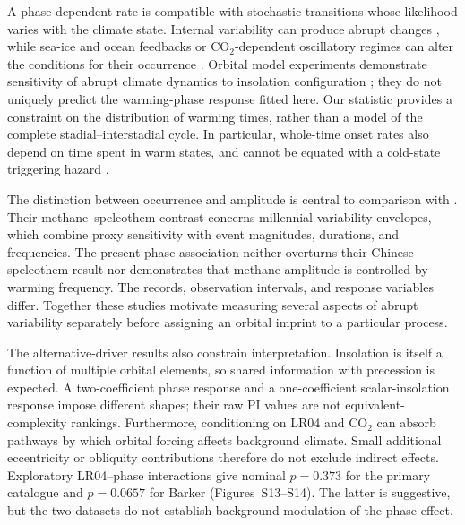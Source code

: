 \documentclass[11pt]{article}
\begin{document}
A phase-dependent rate is compatible with stochastic transitions whose likelihood varies with the climate state. Internal variability can produce abrupt changes \citep{ditlevsen2005recurrence,kleppin2015stochastic}, while sea-ice and ocean feedbacks or CO$_2$-dependent oscillatory regimes can alter the conditions for their occurrence \citep{dokken2013dansgaard,pedro2022dansgaard,vettoretti2022atmospheric}. Orbital model experiments demonstrate sensitivity of abrupt climate dynamics to insolation configuration \citep{zhang2021direct}; they do not uniquely predict the warming-phase response fitted here. Our statistic provides a constraint on the distribution of warming times, rather than a model of the complete stadial--interstadial cycle. In particular, whole-time onset rates also depend on time spent in warm states, and cannot be equated with a cold-state triggering hazard \citep{lohmann2018random}.

The distinction between occurrence and amplitude is central to comparison with \citet{thirumalai2020methane}. Their methane--speleothem contrast concerns millennial variability envelopes, which combine proxy sensitivity with event magnitudes, durations, and frequencies. The present phase association neither overturns their Chinese-speleothem result nor demonstrates that methane amplitude is controlled by warming frequency. The records, observation intervals, and response variables differ. Together these studies motivate measuring several aspects of abrupt variability separately before assigning an orbital imprint to a particular process.

The alternative-driver results also constrain interpretation. Insolation is itself a function of multiple orbital elements, so shared information with precession is expected. A two-coefficient phase response and a one-coefficient scalar-insolation response impose different shapes; their raw PI values are not equivalent-complexity rankings. Furthermore, conditioning on LR04 and CO$_2$ can absorb pathways by which orbital forcing affects background climate. Small additional eccentricity or obliquity contributions therefore do not exclude indirect effects. Exploratory LR04--phase interactions give nominal $p=0.373$ for the primary catalogue and $p=0.0657$ for Barker (Figures~S13--S14). The latter is suggestive, but the two datasets do not establish background modulation of the phase effect.
\end{document}
